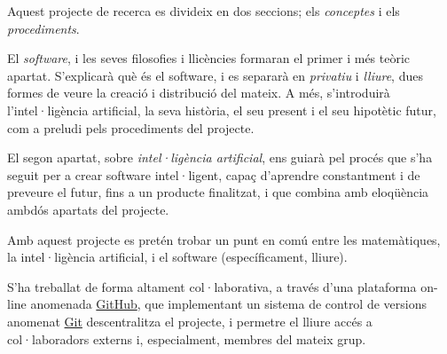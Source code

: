 Aquest projecte de recerca es divideix en dos seccions; els \emph{conceptes}
i els \emph{procediments}.

El \emph{software}, i les seves filosofies i llicències formaran el primer i més
teòric apartat. S'explicarà què és el software, i es separarà en \emph{privatiu}
i \emph{lliure}, dues formes de veure la creació i distribució del mateix. A més,
s'introduirà l'intel·ligència artificial, la seva història, el seu present i el
seu hipotètic futur, com a preludi pels procediments del projecte.

El segon apartat, sobre \emph{intel·ligència artificial}, ens guiarà pel procés
que s'ha seguit per a crear software intel·ligent, capaç d'aprendre constantment
i de preveure el futur, fins a un producte finalitzat, i que combina amb eloqüència
ambdós apartats del projecte.

Amb aquest projecte es pretén trobar un punt en comú entre les matemàtiques,
la intel·ligència artificial, i el software (específicament, lliure).

S'ha treballat de forma altament col·laborativa, a través d'una plataforma
on-line anomenada \href{http://github.com}{GitHub}, que implementant un sistema
de control de versions anomenat \href{http://git-scm.com/}{Git} descentralitza
el projecte, i permetre el lliure accés a col·laboradors externs i, especialment, membres
del mateix grup.
